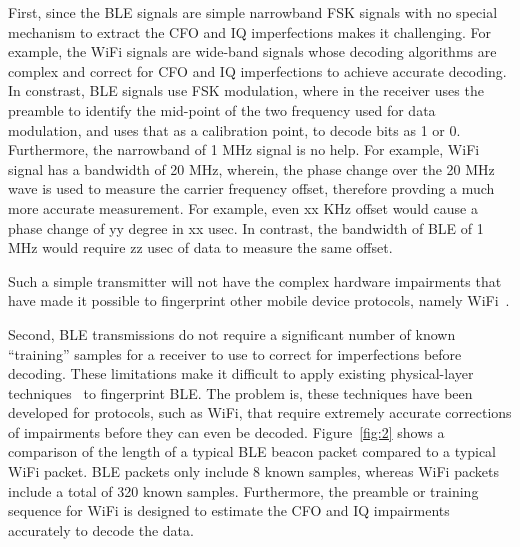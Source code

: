 First, since the BLE signals are simple narrowband FSK signals with no special mechanism to extract
the CFO and IQ imperfections makes it challenging. For example, the WiFi signals are wide-band signals
whose decoding algorithms are complex and correct for CFO and IQ imperfections to achieve accurate decoding.
In constrast, BLE signals use FSK modulation, where in the receiver uses the preamble to identify the mid-point
of the two frequency used for data modulation, and uses that as a calibration point, to decode bits as 1 or 0. 
Furthermore, the narrowband of 1 MHz signal is no help. For example, WiFi signal has a bandwidth of 20 MHz, wherein, 
the phase change over the 20 MHz wave is used to measure the carrier frequency offset, therefore provding a much more accurate measurement. For example, even xx KHz offset would cause a phase change of yy degree in xx usec. In contrast, the bandwidth of BLE of 1 MHz would require zz usec of data to measure the same offset.  

%
Such a simple transmitter will not have the complex hardware
impairments that have made it possible to fingerprint other mobile device protocols, 
namely WiFi~\cite{vohuuusrp,Brik_radiometric,deviceID_kose}.
%
%
%
%
\fi

Second, BLE transmissions do not require a significant number of known ``training''
samples for a receiver to use to correct for imperfections before decoding.
%  
These limitations make it difficult to apply existing physical-layer techniques~\cite{vohuuusrp,Brik_radiometric,deviceID_kose,Intrusion_hall,suskitransient,deeplearning_merchant,lora_robyns,gopalakrishnan2019robust}
to fingerprint BLE.
%
The problem is, these techniques have been developed for protocols, such as
WiFi, that require extremely accurate
corrections of impairments before they can even be decoded.
%
Figure~\ref{fig:2} shows a comparison of the length of a typical
BLE beacon packet compared to a typical WiFi packet.
%
BLE packets only include 8 known samples, whereas WiFi packets include 
a total of 320 known samples. Furthermore, the preamble or training sequence 
for WiFi is designed to estimate the CFO and IQ impairments accurately to decode
the data. 



